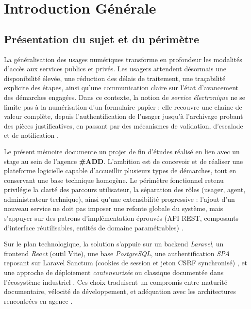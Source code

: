 \chapter{Introduction Générale}

\section{Présentation du sujet et du périmètre}

La généralisation des usages numériques transforme en profondeur les modalités d'accès aux services publics et privés. Les usagers attendent désormais une disponibilité élevée, une réduction des délais de traitement, une traçabilité explicite des étapes, ainsi qu'une communication claire sur l'état d'avancement des démarches engagées. Dans ce contexte, la notion de \emph{service électronique} ne se limite pas à la numérisation d'un formulaire papier : elle recouvre une chaîne de valeur complète, depuis l'authentification de l'usager jusqu'à l'archivage probant des pièces justificatives, en passant par des mécanismes de validation, d'escalade et de notification \cite{fielding2000,rfc7231}.

Le présent mémoire documente un projet de fin d'études réalisé en lien avec un stage au sein de l'agence \textbf{\#ADD}. L'ambition est de concevoir et de réaliser une plateforme logicielle capable d'accueillir plusieurs types de démarches, tout en conservant une base technique homogène. Le périmètre fonctionnel retenu privilégie la clarté des parcours utilisateur, la séparation des rôles (usager, agent, administrateur technique), ainsi qu'une extensibilité progressive : l'ajout d'un nouveau service ne doit pas imposer une refonte globale du système, mais s'appuyer sur des patrons d'implémentation éprouvés (API REST, composants d'interface réutilisables, entités de domaine paramétrables) \cite{fowler2002,gamma1994}.

Sur le plan technologique, la solution s'appuie sur un backend \emph{Laravel}, un frontend \emph{React} (outil Vite), une base \emph{PostgreSQL}, une authentification \emph{SPA} reposant sur Laravel Sanctum (cookies de session et jeton CSRF synchronisé) \cite{sanctumdoc}, et une approche de déploiement \emph{conteneurisée} ou classique documentée dans l'écosystème industriel \cite{dockerdoc,twelvefactor}. Ces choix traduisent un compromis entre maturité documentaire, vélocité de développement, et adéquation avec les architectures rencontrées en agence \cite{bass2021,sommerville2016}.

